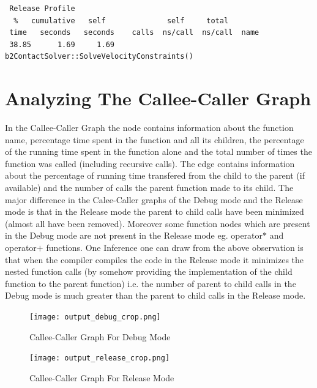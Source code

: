 \documentclass[11pt]{article}
\begin{document}
\begin{verbatim}
 Release Profile
  %   cumulative   self              self     total           
 time   seconds   seconds    calls  ns/call  ns/call  name    
 38.85      1.69     1.69                             b2ContactSolver::SolveVelocityConstraints()
\end{verbatim}

\section{Analyzing The Callee-Caller Graph}
	In the Callee-Caller Graph the node contains information about the function name, percentage time spent in the function and all its children, the percentage of the running time spent in the function alone and the total number of times the function was called (including recursive calls). The edge contains information about the percentage of running time transfered from the child to the parent (if available) and the number of calls the parent function made to its child.\newline
	The major difference in the Calee-Caller graphs of the Debug mode and the Release mode is that in the Release mode the parent to child calls have been minimized (almost all have been removed). Moreover some function nodes which are present in the Debug mode are not present in the Release mode eg. operator$*$ and operator$+$ functions.\newline
	One Inference one can draw from the above observation is that when the compiler compiles the code in the Release mode it minimizes the nested function calls (by somehow providing the implementation of the child function to the parent function) i.e. the number of parent to child calls in the Debug mode is much greater than the parent to child calls in the Release mode. 

	\begin{figure}\begin{center}\texttt{[image: output\_debug\_crop.png]}\caption{Callee-Caller Graph For Debug Mode}\end{center}\end{figure}
	\begin{figure}[h]\begin{center}\texttt{[image: output\_release\_crop.png]}\caption{Callee-Caller Graph For Release Mode}\end{center}\end{figure}
\end{document}
